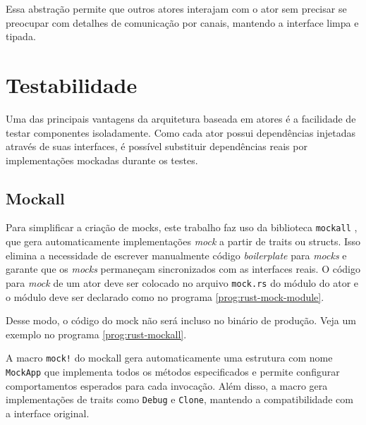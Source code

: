 Essa abstração permite que outros atores interajam com o ator sem precisar se preocupar com detalhes de comunicação por canais, mantendo a interface limpa e tipada.

\section{Testabilidade}

Uma das principais vantagens da arquitetura baseada em atores é a facilidade de testar componentes isoladamente. Como cada ator possui dependências injetadas através de suas interfaces, é possível substituir dependências reais por implementações mockadas durante os testes.

\subsection{Mockall}

Para simplificar a criação de mocks, este trabalho faz uso da biblioteca \texttt{mockall} \citep{mockall}, que gera automaticamente implementações \textit{mock} a partir de traits ou structs. Isso elimina a necessidade de escrever manualmente código \textit{boilerplate} para \textit{mocks} e garante que os \textit{mocks} permaneçam sincronizados com as interfaces reais. O código para \textit{mock} de um ator deve ser colocado no arquivo \texttt{mock.rs} do módulo do ator e o módulo deve ser declarado como no programa \ref{prog:rust-mock-module}.

\begin{program}
  
  \caption{Exemplo de declaração de módulo para mock.\label{prog:rust-mock-module}}
\end{program}

Desse modo, o código do mock não será incluso no binário de produção. Veja um exemplo no programa \ref{prog:rust-mockall}.

\begin{program}
  
  \caption{Exemplo de mock usando mockall.\label{prog:rust-mockall}}
\end{program}

A macro \texttt{mock!} do mockall gera automaticamente uma estrutura com nome \texttt{MockApp} que implementa todos os métodos especificados e permite configurar comportamentos esperados para cada invocação. Além disso, a macro gera implementações de traits como \texttt{Debug} e \texttt{Clone}, mantendo a compatibilidade com a interface original.

